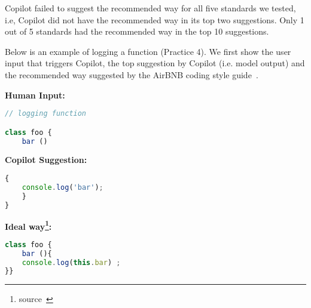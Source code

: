 Copilot failed to suggest the recommended way for all five standards we tested, i.e, Copilot did not have the recommended way in its top two suggestions. Only 1 out of 5 standards had the recommended way in the top 10 suggestions. 

Below is an example of logging a function (Practice 4). 
We first show the user input that triggers Copilot, the top suggestion by Copilot (i.e. model output) and the recommended way suggested by the AirBNB coding style guide~\cite{airbnb_code}.

\begin{tcolorbox}[title=Logging a Function,boxsep=.5mm]
\textbf{Human Input:}
\begin{lstlisting}[language=JavaScript]
// logging function

class foo {
    bar ()
\end{lstlisting}
\tcbline
\textbf{Copilot Suggestion:}
\begin{lstlisting}[language=JavaScript]
{
    console.log('bar');
    }
}
\end{lstlisting}
\tcbline
\textbf{Ideal way\footnote{source~\cite{airbnb_code}}:}
\begin{lstlisting}[language=JavaScript]
class foo {
    bar (){ 
    console.log(this.bar) ;
}}
\end{lstlisting}
\end{tcolorbox}
